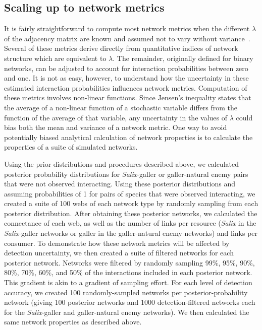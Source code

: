 \documentclass[12pt]{article}
\begin{document}
\begin{spacing}{2.0}
  \subsection*{Scaling up to network metrics}


    It is fairly straightforward to compute most network metrics when the different $\lambda$ of the adjacency matrix are known and assumed not to vary without variance~\citep{Poisot2016}. Several of these metrics derive directly from quantitative indices of network structure which are equivalent to $\lambda$. The remainder, originally defined for binary networks, can be adjusted to account for interaction probabilities between zero and one. It is not as easy, however, to understand how the uncertainty in these estimated interaction probabilities influences network metrics. Computation of these metrics involves non-linear functions. Since Jensen's inequality states that the average of a non-linear function of a stochastic variable differs from the function of the average of that variable, any uncertainty in the values of $\lambda$ could bias both the mean and variance of a network metric. One way to avoid potentially biased analytical calculation of network properties is to calculate the properties of a suite of simulated networks.

    Using the prior distributions and procedures described above, we calculated posterior probability distributions for \emph{Salix}-galler or galler-natural enemy pairs that were not observed interacting. Using these posterior distributions and assuming probabilities of 1 for pairs of species that were observed interacting, we created a suite of 100 webs of each network type by randomly sampling from each posterior distribution. After obtaining these posterior networks, we calculated the connectance of each web, as well as the number of links per resource (\emph{Salix} in the \emph{Salix}-galler networks or galler in the galler-natural enemy networks) and links per consumer. To demonstrate how these network metrics will be affected by detection uncertainty, we then created a suite of filtered networks for each posterior network. Networks were filtered by randomly sampling 99\%, 95\%, 90\%, 80\%, 70\%, 60\%, and 50\% of the interactions included in each posterior network. This gradient is akin to a gradient of sampling effort. For each level of detection accuracy, we created 100 randomly-sampled networks per posterior-probability network (giving 100 posterior networks and 1000 detection-filtered networks each for the \emph{Salix}-galler and galler-natural enemy networks). We then calculated the same network properties as described above.


\end{spacing}
\end{document}

